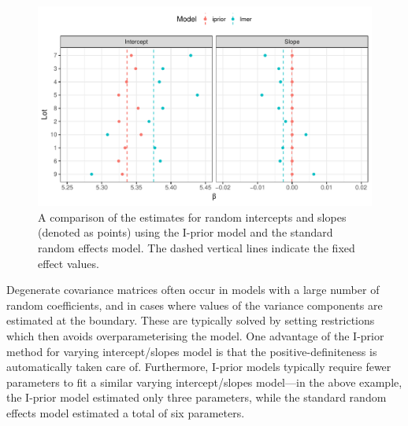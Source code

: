 \documentclass[showframe,11pt,twoside,openright]{report}\usepackage[]{graphicx}\usepackage{xcolor}
\makeatletter
\def\maxwidth{ %
  \ifdim\Gin@nat@width>\linewidth
    \linewidth
  \else
    \Gin@nat@width
  \fi
}
\newenvironment{kframe}{%
 \def\at@end@of@kframe{}%
 \ifinner\ifhmode%
  \def\at@end@of@kframe{\end{minipage}}%
  \begin{minipage}{\columnwidth}%
 \fi\fi%
 \def\FrameCommand##1{\hskip\@totalleftmargin \hskip-\fboxsep
 \colorbox{shadecolor}{##1}\hskip-\fboxsep
     \hskip-\linewidth \hskip-\@totalleftmargin \hskip\columnwidth}%
 \MakeFramed {\advance\hsize-\width
   \@totalleftmargin\z@ \linewidth\hsize
   \@setminipage}}%
 {\par\unskip\endMakeFramed%
 \at@end@of@kframe}
\newenvironment{knitrout}{}{} %
\makeatother
\begin{document}
\begin{knitrout}
\color{fgcolor}\begin{kframe}
\singlespacing\end{kframe}\begin{figure}[htbp]

{\centering \includegraphics[width=\maxwidth]{figure/04-IGF_plot_beta-1} 

}

\caption[A comparison of the estimates for random intercepts and slopes (denoted as points) using the I-prior model and the standard random effects model]{A comparison of the estimates for random intercepts and slopes (denoted as points) using the I-prior model and the standard random effects model. The dashed vertical lines indicate the fixed effect values.}\label{fig:IGF.plot.beta}
\end{figure}


\end{knitrout}

Degenerate covariance matrices often occur in models with a large number of random coefficients, and in cases where values of the variance components are estimated at the boundary.
These are typically solved by setting restrictions which then avoids overparameterising the model.
One advantage of the I-prior method for varying intercept/slopes model is that the positive-definiteness is automatically taken care of.
Furthermore, I-prior models typically require fewer parameters to fit a similar varying intercept/slopes model---in the above example, the I-prior model estimated only three parameters, while the standard random effects model estimated a total of six parameters.
\end{document}
